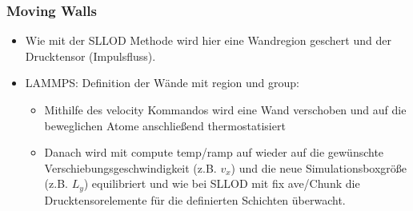 \documentclass[a4paper, 10pt, 
               numbers=noenddot, toc=graduated,
               headsepline=true, footsepline=true,
               twoside=false, titlepage=true, 
               bibliography=totoc]{scrartcl}
\begin{document}
	\subsubsection{Moving Walls}
	    \begin{itemize}
		 	\item Wie mit der SLLOD Methode wird hier eine Wandregion geschert und der Drucktensor (Impulsfluss).
			\item LAMMPS: Definition der Wände mit region und group:
			\begin{itemize}
				\item Mithilfe des velocity Kommandos wird eine Wand verschoben und auf die beweglichen Atome anschließend thermostatisiert
				\item Danach wird mit compute temp/ramp auf wieder auf die gewünschte Verschiebungsgeschwindigkeit (z.B. $v_x$) und die neue Simulationsboxgröße (z.B. $L_y$) equilibriert und wie bei SLLOD mit fix ave/Chunk die Drucktensorelemente für die definierten Schichten überwacht.
			\end{itemize}
		\end{itemize}
\end{document}
